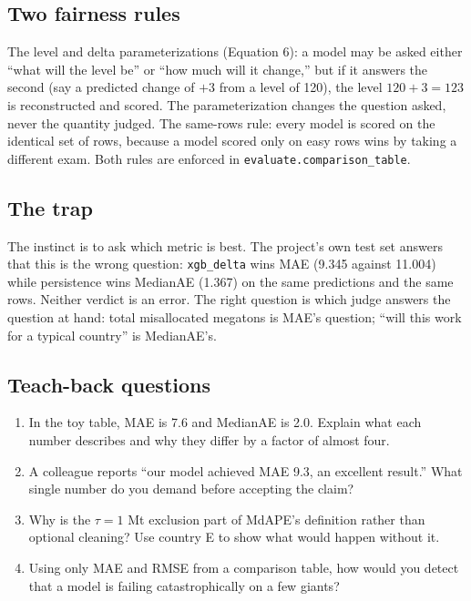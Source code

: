 \documentclass[11pt]{article}
\begin{document}
\subsection{Two fairness rules}

The level and delta parameterizations (Equation 6): a model may be asked
either ``what will the level be'' or ``how much will it change,'' but if
it answers the second (say a predicted change of $+3$ from a level of
120), the level $120 + 3 = 123$ is reconstructed and scored. The
parameterization changes the question asked, never the quantity judged.
The same-rows rule: every model is scored on the identical set of rows,
because a model scored only on easy rows wins by taking a different exam.
Both rules are enforced in \texttt{evaluate.comparison\_table}.

\subsection{The trap}

The instinct is to ask which metric is best. The project's own test set
answers that this is the wrong question: \texttt{xgb\_delta} wins MAE
(9.345 against 11.004) while persistence wins MedianAE (1.367) on the same
predictions and the same rows. Neither verdict is an error. The right
question is which judge answers the question at hand: total misallocated
megatons is MAE's question; ``will this work for a typical country'' is
MedianAE's.

\subsection{Teach-back questions}

\begin{enumerate}
\item In the toy table, MAE is 7.6 and MedianAE is 2.0. Explain what each
number describes and why they differ by a factor of almost four.
\item A colleague reports ``our model achieved MAE 9.3, an excellent
result.'' What single number do you demand before accepting the claim?
\item Why is the $\tau = 1$ Mt exclusion part of MdAPE's definition rather
than optional cleaning? Use country E to show what would happen without it.
\item Using only MAE and RMSE from a comparison table, how would you
detect that a model is failing catastrophically on a few giants?
\end{enumerate}
\end{document}
